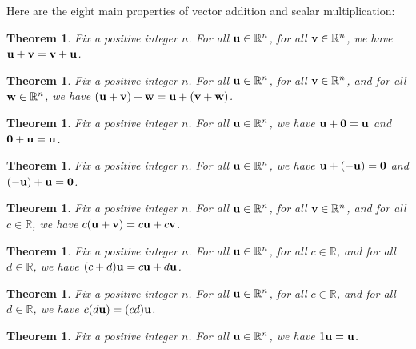 \documentclass{book}
\newcounter{ekcounter}%
\theoremstyle{ekimcustom}
\newtheorem{theorem}[ekcounter]{Theorem}
\begin{document}
Here are the eight main properties of vector addition and scalar multiplication:
\begin{theorem}\label{theorem:vector-addition-commutative}
Fix a positive integer $n$. For all ${\bf u} \in \mathbb{R}^n$, for all ${\bf v} \in \mathbb{R}^n$, we have ${\bf u}+{\bf v} = {\bf v} + {\bf u}$.
\end{theorem}
\begin{theorem}
Fix a positive integer $n$. For all ${\bf u} \in \mathbb{R}^n$, for all ${\bf v} \in \mathbb{R}^n$, and for all ${\bf w} \in \mathbb{R}^n$, we have $({\bf u}+{\bf v}) + {\bf w} = {\bf u} + ({\bf v} + {\bf w})$.
\end{theorem}
\begin{theorem}
Fix a positive integer $n$. For all ${\bf u} \in \mathbb{R}^n$, we have ${\bf u}+{\bf 0} = {\bf u}$ and ${\bf 0} + {\bf u} = {\bf u}$.
\end{theorem}
\begin{theorem}
Fix a positive integer $n$. For all ${\bf u} \in \mathbb{R}^n$, we have ${\bf u}+(-{\bf u}) = {\bf 0}$ and $(-{\bf u})+{\bf u} = {\bf 0}$.
\end{theorem}
\begin{theorem}\label{theorem:scalar-multiplication-distributive}
Fix a positive integer $n$. For all ${\bf u} \in \mathbb{R}^n$, for all ${\bf v} \in \mathbb{R}^n$, and for all $c \in \mathbb{R}$, we have $c({\bf u}+{\bf v}) = c{\bf u} + c{\bf v}$.
\end{theorem}
\begin{theorem}
Fix a positive integer $n$. For all ${\bf u} \in \mathbb{R}^n$, for all $c \in \mathbb{R}$, and for all $d \in \mathbb{R}$, we have $(c+d){\bf u} = c{\bf u} + d{\bf u}$.
\end{theorem}
\begin{theorem}
Fix a positive integer $n$. For all ${\bf u} \in \mathbb{R}^n$, for all $c \in \mathbb{R}$, and for all $d \in \mathbb{R}$, we have $c(d{\bf u}) = (cd){\bf u}$.
\end{theorem}
\begin{theorem}
Fix a positive integer $n$. For all ${\bf u} \in \mathbb{R}^n$, we have $1{\bf u} = {\bf u}$.
\end{theorem}
\end{document}
